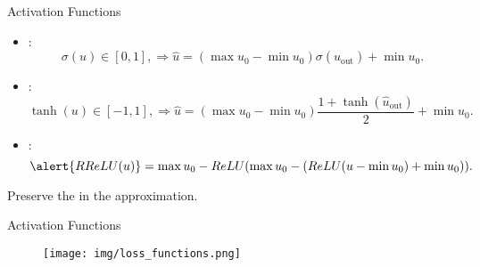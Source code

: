     \begin{frame}{Activation Functions}
        \begin{itemize}
            \item {}:
            $$\sigma(u)\in[0,1],\Longrightarrow \hat u= (\max u_0-\min u_0)\sigma(\hat u_{\text{out}})+\min u_0.$$
            \item {}:
            $$\tanh(u)\in[-1,1],\Longrightarrow \hat u=(\max u_0-\min u_0)\frac{1+\tanh(\hat{u}_{\text{out}})}{2}+\min u_0.$$
            \item {}:
            $$\alert{RReLU(u)}=\max u_0-ReLU(\max u_0 - (ReLU(u-\min u_0) + \min u_0)).$$
        \end{itemize}
    
        \begin{block}{}
            Preserve the  in the approximation.
        \end{block}
    \end{frame}
    
    \begin{frame}{Activation Functions}
        \begin{figure}
            \centering
            \texttt{[image: img/loss\_functions.png]}
        \end{figure}
    \end{frame}
    
